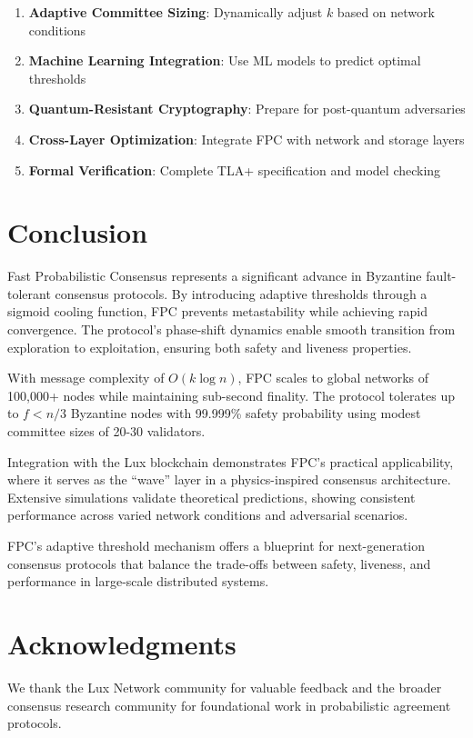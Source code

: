 \documentclass[11pt,a4paper]{article}
\begin{document}
\begin{enumerate}
\item \textbf{Adaptive Committee Sizing}: Dynamically adjust $k$ based on network conditions
\item \textbf{Machine Learning Integration}: Use ML models to predict optimal thresholds
\item \textbf{Quantum-Resistant Cryptography}: Prepare for post-quantum adversaries
\item \textbf{Cross-Layer Optimization}: Integrate FPC with network and storage layers
\item \textbf{Formal Verification}: Complete TLA+ specification and model checking
\end{enumerate}

\section{Conclusion}
\label{sec:conclusion}

Fast Probabilistic Consensus represents a significant advance in Byzantine fault-tolerant consensus protocols. By introducing adaptive thresholds through a sigmoid cooling function, FPC prevents metastability while achieving rapid convergence. The protocol's phase-shift dynamics enable smooth transition from exploration to exploitation, ensuring both safety and liveness properties.

With message complexity of $O(k \log n)$, FPC scales to global networks of 100,000+ nodes while maintaining sub-second finality. The protocol tolerates up to $f < n/3$ Byzantine nodes with 99.999\% safety probability using modest committee sizes of 20-30 validators.

Integration with the Lux blockchain demonstrates FPC's practical applicability, where it serves as the ``wave'' layer in a physics-inspired consensus architecture. Extensive simulations validate theoretical predictions, showing consistent performance across varied network conditions and adversarial scenarios.

FPC's adaptive threshold mechanism offers a blueprint for next-generation consensus protocols that balance the trade-offs between safety, liveness, and performance in large-scale distributed systems.

\section*{Acknowledgments}

We thank the Lux Network community for valuable feedback and the broader consensus research community for foundational work in probabilistic agreement protocols.
\end{document}
